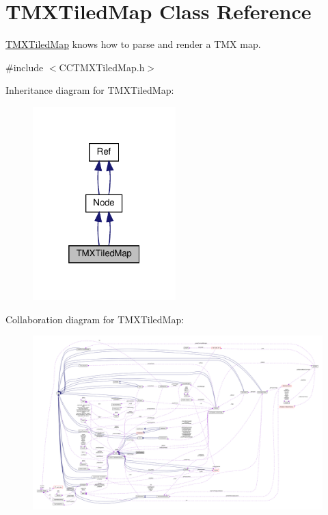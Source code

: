 \hypertarget{classTMXTiledMap}{}\section{T\+M\+X\+Tiled\+Map Class Reference}
\label{classTMXTiledMap}


\hyperlink{classTMXTiledMap}{T\+M\+X\+Tiled\+Map} knows how to parse and render a T\+MX map.  




{\ttfamily \#include $<$C\+C\+T\+M\+X\+Tiled\+Map.\+h$>$}



Inheritance diagram for T\+M\+X\+Tiled\+Map\+:
\nopagebreak
\begin{figure}[H]
\begin{center}
\leavevmode
\includegraphics[width=157pt]{classTMXTiledMap__inherit__graph}
\end{center}
\end{figure}


Collaboration diagram for T\+M\+X\+Tiled\+Map\+:
\nopagebreak
\begin{figure}[H]
\begin{center}
\leavevmode
\includegraphics[width=350pt]{classTMXTiledMap__coll__graph}
\end{center}
\end{figure}
